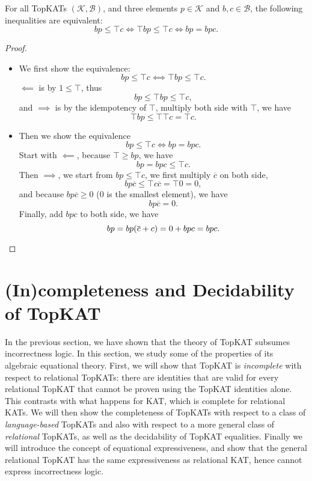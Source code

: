 \begin{theorem}\label{the: hoare logic formulation equivalent}
  For all TopKATs \((𝒦, ℬ)\), and three elements
  \(p \in 𝒦\) and \(b, c \in ℬ\), the following inequalities
  are equivalent:
    \[b p \leq \top c  \iff  \top b p \leq \top c \iff b p = b p c.\]
\end{theorem}

\begin{proof}
\begin{itemize}
    \item We first show the equivalence:
        \[b p ≤ ⊤ c  ⟺  ⊤ b p ≤ ⊤ c.\]
        \(⟸\) is by \(1 ≤ ⊤\),
        thus \[b p \leq \top b p \leq \top c,\]
        and \(⟹\) is by the idempotency of \(\top\),
        multiply both side with \(\top\), we have 
        \[\top b p \leq \top \top c = \top c.\]
    \item Then we show the equivalence
        \[b p \leq \top c  \iff  b p = b p c.\]
        Start with \(⟸\), because \(⊤ ≥ b p\), we have
        \[b p = b p c ≤ ⊤ c.\]
        Then \(⟹\), we start from \(b p ≤ ⊤ c\),
        we first multiply \(\overline{c}\) on both side,
        \[b p \overline{c} \leq \top c \overline{c} = \top 0 = 0,\]
        and because \(b p \overline{c} \geq 0\) (\(0\) is the smallest element),
        we have \[b p \overline{c} = 0.\]
        Finally, add \(b p c\) to both side, we have
        \[b p = b p (\overline{c} + c) = 0 + b p c = b p c.\qedhere\]
\end{itemize}
\end{proof}

\section{(In)completeness and Decidability of TopKAT}\label{sec: properties of TopKAT}


In the previous section, we have shown that the theory of TopKAT subsumes incorrectness logic. In this section, we study some of the properties of its algebraic equational theory.
%
First, we will show that TopKAT is \emph{incomplete} with respect to relational
TopKATs: there are identities that are valid for every relational TopKAT that
cannot be proven using the TopKAT identities alone. This contrasts with what
happens for KAT, which is complete for relational KATs.
%
We will then show the completeness of TopKATs with respect to a class of
\emph{language-based} TopKATs and also with respect to a more general class of
\emph{relational} TopKATs, as well as the decidability of TopKAT equalities.
Finally we will introduce the concept of equational expressiveness,
and show that the general relational TopKAT has the same expressiveness as relational KAT,
hence cannot express incorrectness logic.


